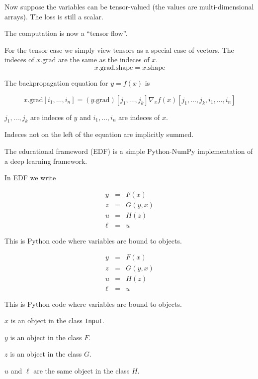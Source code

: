 {\vfill
Now suppose the variables can be  tensor-valued (the values are multi-dimensional arrays).  The loss is still a scalar.

\vfill
The computation is now a ``tensor flow''.

For the tensor case we simply view tensors as a special case of vectors.  The indeces of $x.\mathrm{grad}$ are the
same as the indeces of $x$.
$$x.\mathrm{grad}.\mathrm{shape} = x.\mathrm{shape}$$

\vfill
The backpropagation equation for $y = f(x)$ is

$$x.\mathrm{grad}[i_1,\ldots,i_n] = (y.\mathrm{grad})[j_1,\ldots,j_k] \nabla_x f(x)[j_1,\ldots,j_k,i_1,\ldots,i_n]$$

\vfill
$j_1,\ldots,j_k$ are indeces of $y$ and $i_1,\ldots,i_n$ are indeces of $x$.

\vfill
Indeces not on the left of the equation are implicitly summed.



The educational frameword (EDF) is a simple Python-NumPy implementation of a deep learning framework.

\vfill
In EDF we write

\vfill
\begin{eqnarray*}
  y & = & F(x) \\
  z & = & G(y,x) \\
  u & = & H(z) \\
  \ell &  = &  u
\end{eqnarray*}
\medskip

\vfill
This is Python code where variables are bound to objects.


\begin{eqnarray*}
  y & = & F(x) \\
  z & = & G(y,x) \\
  u & = & H(z) \\
  \ell &  = &  u
\end{eqnarray*}

\vfill
This is Python code where variables are bound to objects.

\vfill
$x$ is an object in the class {\tt Input}.

\vfill
$y$ is an object in the class $F$.

\vfill
$z$ is an object in the class $G$.

\medskip
$u$ and $\ell$ are the same object in the class $H$.

}
